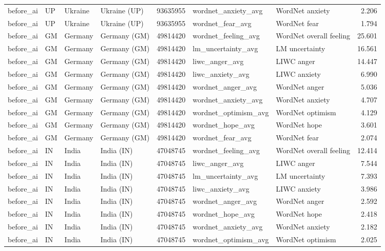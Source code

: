 \begin{tabular}{llllrllr}
before\_ai & UP & Ukraine & Ukraine (UP) & 93635955 & wordnet\_anxiety\_avg & WordNet anxiety & 2.206 \\
before\_ai & UP & Ukraine & Ukraine (UP) & 93635955 & wordnet\_fear\_avg & WordNet fear & 1.794 \\
before\_ai & GM & Germany & Germany (GM) & 49814420 & wordnet\_feeling\_avg & WordNet overall feeling & 25.601 \\
before\_ai & GM & Germany & Germany (GM) & 49814420 & lm\_uncertainty\_avg & LM uncertainty & 16.561 \\
before\_ai & GM & Germany & Germany (GM) & 49814420 & liwc\_anger\_avg & LIWC anger & 14.447 \\
before\_ai & GM & Germany & Germany (GM) & 49814420 & liwc\_anxiety\_avg & LIWC anxiety & 6.990 \\
before\_ai & GM & Germany & Germany (GM) & 49814420 & wordnet\_anger\_avg & WordNet anger & 5.036 \\
before\_ai & GM & Germany & Germany (GM) & 49814420 & wordnet\_anxiety\_avg & WordNet anxiety & 4.707 \\
before\_ai & GM & Germany & Germany (GM) & 49814420 & wordnet\_optimism\_avg & WordNet optimism & 4.129 \\
before\_ai & GM & Germany & Germany (GM) & 49814420 & wordnet\_hope\_avg & WordNet hope & 3.601 \\
before\_ai & GM & Germany & Germany (GM) & 49814420 & wordnet\_fear\_avg & WordNet fear & 2.074 \\
before\_ai & IN & India & India (IN) & 47048745 & wordnet\_feeling\_avg & WordNet overall feeling & 12.414 \\
before\_ai & IN & India & India (IN) & 47048745 & liwc\_anger\_avg & LIWC anger & 7.544 \\
before\_ai & IN & India & India (IN) & 47048745 & lm\_uncertainty\_avg & LM uncertainty & 7.393 \\
before\_ai & IN & India & India (IN) & 47048745 & liwc\_anxiety\_avg & LIWC anxiety & 3.986 \\
before\_ai & IN & India & India (IN) & 47048745 & wordnet\_anger\_avg & WordNet anger & 2.592 \\
before\_ai & IN & India & India (IN) & 47048745 & wordnet\_hope\_avg & WordNet hope & 2.418 \\
before\_ai & IN & India & India (IN) & 47048745 & wordnet\_anxiety\_avg & WordNet anxiety & 2.182 \\
before\_ai & IN & India & India (IN) & 47048745 & wordnet\_optimism\_avg & WordNet optimism & 2.025 \\

\end{tabular}
